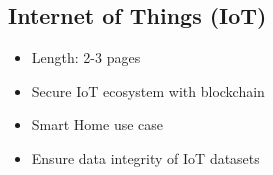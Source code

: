 \subsection{Internet of Things (IoT)}


\begin{itemize}
  \item Length: 2-3 pages
  \item Secure IoT ecosystem with blockchain
  \item Smart Home use case
  \item Ensure data integrity of IoT datasets
\end{itemize}
